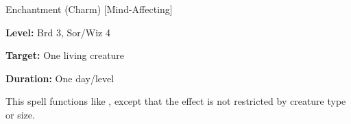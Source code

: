 
Enchantment (Charm) [Mind-Affecting]

\textbf{Level:} Brd 3, Sor/Wiz 4

\textbf{Target:} One living creature

\textbf{Duration:} One day/level

This spell functions like , except that the effect is not 
restricted by creature type or size.

